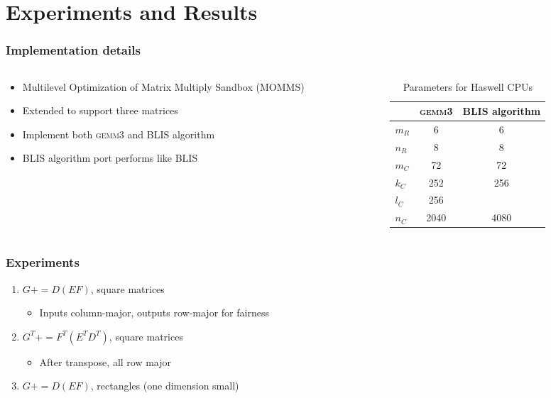 \documentclass{beamer}
\newcommand*{\pluseq}{\mathrel{{+}{=}}}
\newcommand*{\gemmt}{{\textsc{gemm3}}}
\begin{document}
\section[Results]{Experiments and Results}
\frame{\sectionpage}

\begin{frame}
  \frametitle{Implementation details}
  \begin{columns}
    \begin{column}{0.5\textwidth}
      \begin{itemize}
      \item Multilevel Optimization of Matrix Multiply Sandbox (MOMMS)
      \item Extended to support three matrices
      \item Implement both \gemmt{} and BLIS algorithm
      \item BLIS algorithm port performs like BLIS
      \end{itemize}
    \end{column}
    \begin{column}{0.5\textwidth}
      \begin{table}
        \centering
        \begin{tabular}{l|c c}
          &\gemmt{}&BLIS algorithm\\ \hline
          $m_R$&6&6\\
          $n_R$&8&8\\
          $m_C$&72&72\\
          $k_C$&252&256\\
          $l_C$&256&\\
          $n_C$&2040&4080\\
        \end{tabular}
        \caption{Parameters for Haswell CPUs}
        \label{tab:haswell-paramss}
      \end{table}
    \end{column}
  \end{columns}
\end{frame}

\begin{frame}
  \frametitle{Experiments}
  \begin{enumerate}
  \item $G \pluseq D(EF)$, square matrices
    \begin{itemize}
    \item Inputs column-major, outputs row-major for fairness
    \end{itemize}
  \item $G^T \pluseq F^T(E^TD^T)$, square matrices
    \begin{itemize}
    \item After transpose, all row major
    \end{itemize}
  \item $G \pluseq D(EF)$, rectangles (one dimension small)
  \end{enumerate}
\end{frame}
\end{document}

